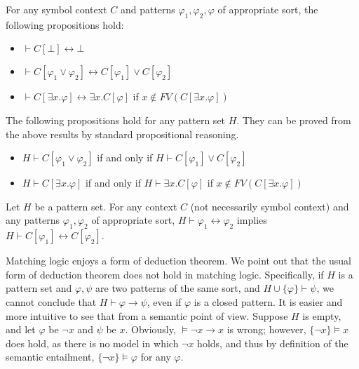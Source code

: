 \documentclass[acmsmall,review,anonymous]{acmart}
\newcommand{\imp}{\to}
\newcommand{\dimp}{\leftrightarrow}
\newcommand{\FV}{\mathit{FV}}
\begin{document}
\begin{proposition}
\label{prop_propgation_of_symbol_application}
For any symbol context $C$ and patterns $\varphi_1, \varphi_2, \varphi$
of appropriate sort,
the following propositions hold:
\begin{itemize}
\item $ \vdash 
          C[\bot] \dimp 
          \bot$
\item $ \vdash 
          C[\varphi_1 \vee \varphi_2] \dimp
          C[\varphi_1] \vee
          C[\varphi_2]$
\item $ \vdash
          C[\exists x . \varphi] \dimp
          \exists x . C[\varphi] $
       \quad if $x \not\in \FV(C[\exists x . \varphi])$
\end{itemize}
The following propositions hold for any pattern set $H$.
They can be proved from the above results
by standard propositional reasoning.
\begin{itemize}
\item $H \vdash 
          C[\varphi_1 \vee \varphi_2]$
      if and only if
      $H \vdash C[\varphi_1] \vee
                     C[\varphi_2]$
\item $H \vdash
          C[\exists x . \varphi] $
      if and only if
      $H \vdash \exists x . C[\varphi]$
      \quad if $x \not\in \FV(C[\exists x . \varphi])$
\end{itemize}
\end{proposition}

\begin{proposition}
\label{prop_congruence_provability_equiv}
Let $H$ be a pattern set.
For any context $C$ (not necessarily symbol context)
and any patterns $\varphi_1, \varphi_2$ of appropriate sort,
$H \vdash \varphi_1 \dimp \varphi_2$
implies
$H \vdash C[\varphi_1] \dimp C[\varphi_2]$.
\end{proposition}

Matching logic enjoys a form of deduction theorem.
We point out that the usual form of deduction theorem does not hold
in matching logic.
Specifically, if $H$ is a pattern set
and $\varphi,\psi$ are two patterns of the same sort,
and $H \cup \{\varphi\} \vdash \psi$,
we cannot conclude that
$H \vdash \varphi \imp \psi$,
even if $\varphi$ is a closed pattern.
It is easier and more intuitive to see that from a semantic point of view.
Suppose $H$ is empty,
and let $\varphi$ be $\neg x$ and $\psi$ be $x$.
Obviously, $\vDash \neg x \imp x$ is wrong;
however, $\{\neg x\} \vDash x$ does hold,
as there is no model in which $\neg x$ holds,
and thus by definition of the semantic entailment, 
$\{\neg x\} \vDash \varphi$ for any $\varphi$.
\end{document}
